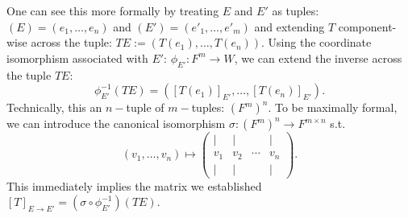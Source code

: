 One can see this more formally by treating $E$ and $E'$ as tuples: $(E) = (e_1, \dots, e_n)$ and $(E')=(e'_1, \dots, e'_m)$ and extending $T$ component-wise across the tuple: $TE:=(T(e_1), \dots, T(e_n))$. Using the coordinate isomorphism associated with $E'$: $\phi_{E'}: F^m\rightarrow W$, we can extend the inverse across the tuple $TE$:
\[
    \phi^{-1}_{E'}(TE) = ([T(e_1)]_{E'}, \dots, [T(e_n)]_{E'}).
\]
Technically, this an $n-$tuple of $m-$tuples: $(F^m)^n$. To be maximally formal, we can introduce the canonical isomorphism $\sigma: (F^m)^n\rightarrow F^{m\times n}$ s.t.
\[
    (v_1, \dots, v_n)\mapsto \begin{pmatrix}
        | & | & & |\\
        v_1 & v_2 &\cdots & v_n\\
        | & | & & |
    \end{pmatrix}.
\]
This immediately implies the matrix we established $[T]_{E\rightarrow E'} = (\sigma \circ \phi_{E'}^{-1})(TE)$.

